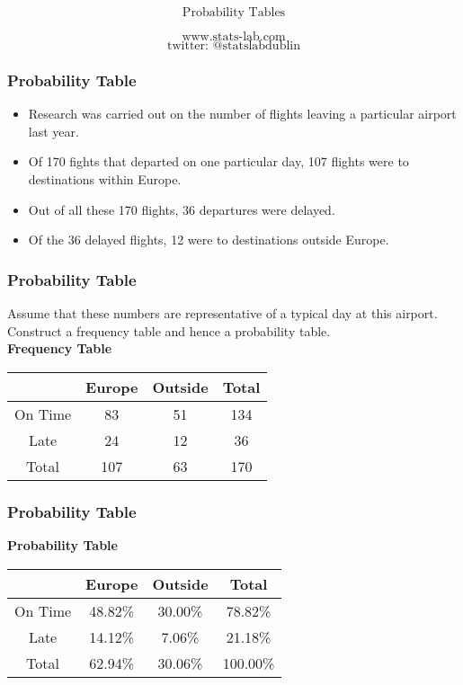 \documentclass{beamer}
\begin{document}
\begin{frame}

{
\Huge
\[\mbox{Probability Tables} \]
}
{
\LARGE
\[\mbox{www.stats-lab.com} \]
\[ \mbox{twitter: @statslabdublin} \] 

}
\end{frame}

\begin{frame}
\frametitle{Probability Table}
\LARGE
\begin{itemize}
\item Research was carried out on the number of flights leaving a particular airport last year. 

\item Of 170 fights that departed on one particular day, 107 flights were to destinations within Europe. 
\item Out of all these 170 flights, 36 departures were delayed. 

\item Of the 36 delayed flights, 12 were to destinations outside Europe. 


\end{itemize}
\end{frame}
\begin{frame}
\frametitle{Probability Table}
\Large
Assume that these numbers are representative of a typical 
day at this airport. Construct a frequency table and hence a probability table.\\ \bigskip
\textbf{Frequency Table}\\ \bigskip
\begin{tabular}{|c|c|c||c|}
\hline  &  \phantom{sp} Europe \phantom{sp} & \phantom{sp} Outside \phantom{sp} &\phantom{sp} Total\phantom{sp}  \\ 
\hline On Time  & 83 & 51 & 134 \\ 
\hline Late & 24 & 12 & 36 \\ \hline
\hline Total  & 107 & 63  & 170  \\ 
\hline 
\end{tabular} 
\end{frame}



\begin{frame}
\frametitle{Probability Table}
\Large
\textbf{Probability Table} \\ \bigskip
\begin{tabular}{|c|c|c||c|}
\hline  &  \phantom{sp} Europe \phantom{sp} & \phantom{sp} Outside \phantom{sp} & \phantom{sp} Total\phantom{sp}  \\ 
\hline On Time  & 48.82\% & 30.00\% & 78.82\% \\ 
\hline Late & 14.12\% & 7.06\% &  21.18\% \\ \hline
\hline Total  & 62.94\% & 30.06\% & 100.00\% \\ 
\hline 
\end{tabular} 
\end{frame}
\end{document}
